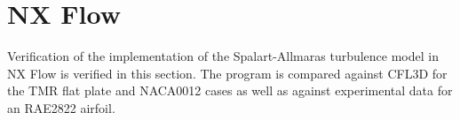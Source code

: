 \section{NX Flow}
\label{sec:resultsnx}
Verification of the implementation of the Spalart-Allmaras turbulence model in NX Flow is verified in this section. The program is compared against CFL3D for the TMR flat plate and NACA0012 cases as well as against experimental data for an RAE2822 airfoil. 



%